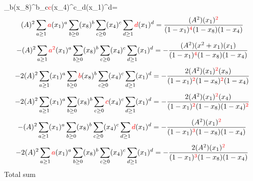 \documentclass{article}
\begin{document}
\sum_{b}(x_8)^{b}\sum_{c}\textcolor{red}{c}(x_4)^{c}\sum_{d}(x_1)^{d}=\]\[(A)^{2}\sum_{a\geq{1}}\textcolor{red}{a}(x_1)^{a}\sum_{b\geq{0}}(x_8)^{b}\sum_{c\geq{0}}(x_4)^{c}\sum_{d\geq{1}}\textcolor{red}{d}(x_1)^{d}=\frac{(A^{2})(x_1)^{\textcolor{red}{2}}}{(1-x_1)^{\textcolor{red}{4}}(1-x_8)(1-x_4)}\]\[-(A)^{2}\sum_{a\geq{1}}\textcolor{red}{a^{2}}(x_1)^{a}\sum_{b\geq{0}}(x_8)^{b}\sum_{c\geq{0}}(x_4)^{c}\sum_{d\geq{1}}(x_1)^{d}=-\frac{(A^{2})(x^{2}+x_1)(x_1)}{(1-x_1)^{\textcolor{red}{4}}(1-x_8)(1-x_4)}\]\[-2(A)^{2}\sum_{a\geq{1}}(x_1)^{a}\sum_{b\geq{0}}\textcolor{red}{b}(x_8)^{b}\sum_{c\geq{0}}(x_4)^{c}\sum_{d\geq{1}}(x_1)^{d}=-\frac{2(A^{2})(x_1)^{\textcolor{red}{2}}(x_8)}{(1-x_1)^{\textcolor{red}{2}}(1-x_8)^{\textcolor{red}{2}}(1-x_4)}\]\[-2(A)^{2}\sum_{a\geq{1}}(x_1)^{a}\sum_{b\geq{0}}(x_8)^{b}\sum_{c\geq{0}}\textcolor{red}{c}(x_4)^{c}\sum_{d\geq{1}}(x_1)^{d}=-\frac{2(A^{2})(x_1)^{\textcolor{red}{2}}(x_4)}{(1-x_1)^{\textcolor{red}{2}}(1-x_8)(1-x_4)^{\textcolor{red}{2}}}\]\[-(A)^{2}\sum_{a\geq{1}}(x_1)^{a}\sum_{b\geq{0}}(x_8)^{b}\sum_{c\geq{0}}(x_4)^{c}\sum_{d\geq{1}}\textcolor{red}{d}(x_1)^{d}=-\frac{(A^{2})(x_1)^{\textcolor{red}{2}}}{(1-x_1)^{\textcolor{red}{3}}(1-x_8)(1-x_4)}\]\[-2(A)^{2}\sum_{a\geq{1}}\textcolor{red}{a}(x_1)^{a}\sum_{b\geq{0}}(x_8)^{b}\sum_{c\geq{0}}(x_4)^{c}\sum_{d\geq{1}}(x_1)^{d}=-\frac{2(A^{2})(x_1)^{\textcolor{red}{2}}}{(1-x_1)^{\textcolor{red}{3}}(1-x_8)(1-x_4)}\]
Total sum
\end{document}
